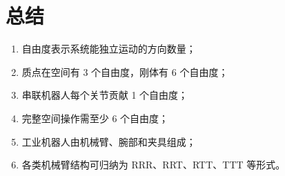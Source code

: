 \documentclass[12pt,a4paper]{article}
\begin{document}
\section{总结}
\begin{enumerate}
  \item 自由度表示系统能独立运动的方向数量；
  \item 质点在空间有 3 个自由度，刚体有 6 个自由度；
  \item 串联机器人每个关节贡献 1 个自由度；
  \item 完整空间操作需至少 6 个自由度；
  \item 工业机器人由机械臂、腕部和夹具组成；
  \item 各类机械臂结构可归纳为 RRR、RRT、RTT、TTT 等形式。
\end{enumerate}
\end{document}
